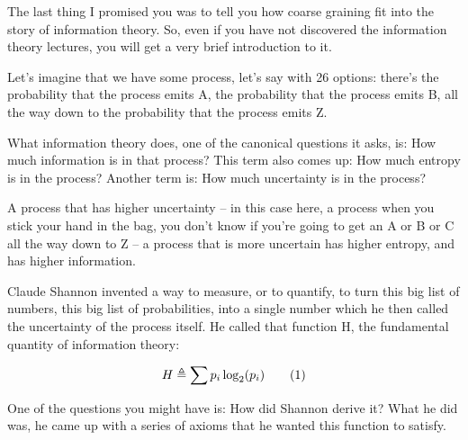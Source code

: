 \documentclass[]{article}
\newcommand\numberthis{\addtocounter{equation}{1}\tag{\theequation}}
\begin{document}
The last thing I promised you
was to tell you how coarse graining
fit into the story of information theory.
So, even if you have not discovered
the information theory lectures,
you will get
a very brief introduction to it.

Let's imagine that we have some process,
let's say with 26 options:
there's the probability
that the process emits A,
the probability that the process emits B,
all the way down to the probability
that the process emits Z.

What information theory does,
one of the canonical questions
it asks, is:
How much information
is in that process?
This term also comes up:
How much entropy is in the process?
Another term is: How much uncertainty is in the process?

A process that has higher uncertainty –
in this case here, a process
when you stick your hand in the bag,
you don't know if you're going
to get an A or B or C
all the way down to Z –
a process that is more uncertain
has higher entropy,
and has higher information.

Claude Shannon invented a way
to measure, or to quantify,
to turn this big list of numbers,
this big list of probabilities,
into a single number which he then called
the uncertainty of the process itself.
He called that function H, the fundamental quantity
of information theory:

\begin{align*}
H \triangleq \sum p_i \log_2(p_i) \numberthis \label{eq:shannon:entropy}
\end{align*}

One of the questions you might have is: How did Shannon derive it?
What he did was, he came up with a series of axioms that he wanted this function to satisfy.
\end{document}
